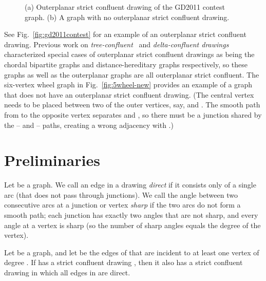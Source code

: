 \documentclass{llncs}
\begin{document}
\begin{figure}[b]
	\centering
		\hfil
	\caption{(a) Outerplanar strict confluent drawing of the GD2011 contest graph. (b) A graph with no outerplanar strict confluent drawing.}
	\label{fig:sea-creature-5wheel-new}
\end{figure}

See Fig.~\ref{fig:gd2011contest} for an example of an outerplanar strict confluent drawing.  Previous work on  \emph{tree-confluent}~\cite{hss-ttcd-04} and \emph{delta-confluent drawings}~\cite{egm-dcd-06} characterized special cases of outerplanar strict confluent drawings as being the chordal bipartite graphs and distance-hereditary graphs respectively, so these graphs as well as the outerplanar graphs are all outerplanar strict confluent. The six-vertex wheel graph in Fig.~\ref{fig:5wheel-new} provides an example of a graph that does not have an outerplanar strict confluent drawing. (The central vertex  needs to be placed between two of the outer vertices, say,  and . The smooth path from  to the opposite vertex  separates  and , so there must be a junction shared by the -- and -- paths, creating a wrong adjacency with .)




\section {Preliminaries}

Let  be a graph.
We call an edge  in a drawing  \emph {direct} if it consists only of a single arc (that does not pass through junctions).
We call the angle between two consecutive arcs at a junction or vertex \emph{sharp} if the two arcs do not form a smooth path; each junction has exactly two angles that are not sharp, and every angle at a vertex is sharp (so the number of sharp angles equals the degree of the vertex).

\begin {lemma} \label {lem:deg2}
  Let  be a graph, and let  be the edges of  that are incident to at least one vertex of degree .
  If  has a strict confluent drawing , then it also has a strict confluent drawing  in which all edges in  are direct.
\end {lemma}
\end{document}
